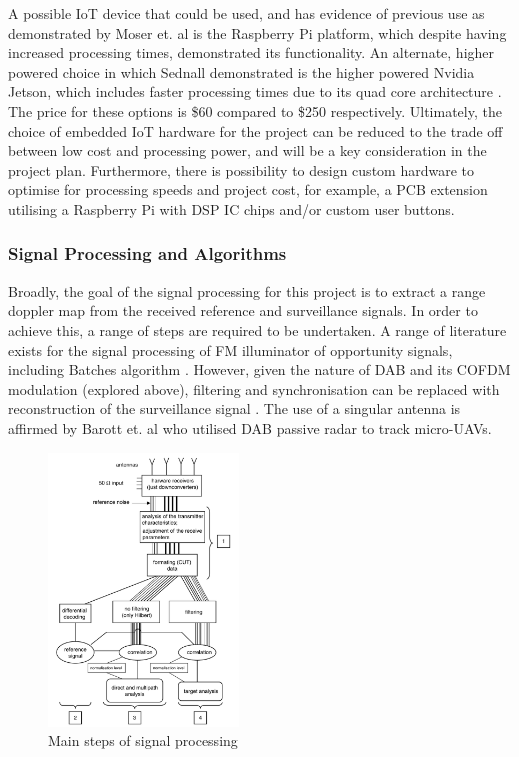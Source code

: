 \documentclass[12pt,a4paper]{article}
\begin{document}
\noindent A possible IoT device that could be used, and has evidence of previous use as demonstrated by Moser et. al \cite{IOTpassiveRadar} is the Raspberry Pi platform, which despite having increased processing times, demonstrated its functionality. An alternate, higher powered choice in which Sednall demonstrated is the higher powered Nvidia Jetson, which includes faster processing times due to its quad core architecture \cite{FMlowCost}. The price for these options is \$60 compared to \$250 respectively. Ultimately, the choice of embedded IoT hardware for the project can be reduced to the trade off between low cost and processing power, and will be a key consideration in the project plan. Furthermore, there is possibility to design custom hardware to optimise for processing speeds and project cost, for example, a PCB extension utilising a Raspberry Pi with DSP IC chips and/or custom user buttons.



\subsubsection{Signal Processing and Algorithms} 

Broadly, the goal of the signal processing for this project is to extract a range doppler map from the received reference and surveillance signals. In order to achieve this, a range of steps are required to be undertaken. A range of literature exists for the signal processing of FM illuminator of opportunity signals, including Batches algorithm \cite{DSPfm}. However, given the nature of DAB and its COFDM modulation (explored above), filtering and synchronisation can be replaced with reconstruction of the surveillance signal \cite{DSPdab}. The use of a singular antenna is affirmed by Barott et. al \cite{DABsingleRadar} who utilised DAB passive radar to track micro-UAVs.

\begin{figure} %
    \centering
    \includegraphics[width=0.45\textwidth]{DSPprocess.png}
    \caption{Main steps of signal processing \cite{detectionDABmodulation}}
    \label{fig:DSP}
\end{figure}
\end{document}
